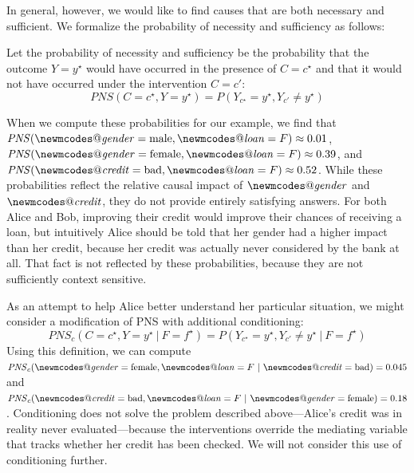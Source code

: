 \documentclass[anon,12pt]{clear2026} %
\makeatletter
\DeclareRobustCommand{\varname}[1]{\begingroup\newmcodes@\mathit{#1}\endgroup}
\newcommand{\pns}{\ensuremath{\mathit{PNS}}}
\makeatother
\begin{document}

In general, however, we would like to find causes that are both necessary and sufficient.
We formalize the probability of necessity and sufficiency as follows:

\begin{definition}
Let the probability of necessity and sufficiency be the probability that the outcome $Y=y^\star$ would have occurred in the presence of $C = c^\star$ and that it would not have occurred under the intervention $C=c'$:
\[\pns(C = c^{\star}, Y = y^\star) =  P\!(Y_{c^{\star}} = y^\star, Y_{c'} \neq y^\star )\]
\end{definition}

When we compute these probabilities for our example, we find that $\pns(\varname{gender}=\text{male}, \varname{loan}=F) \approx 0.01$, $\pns(\varname{gender}=\text{female}, \varname{loan}=F) \approx 0.39$, and $\pns(\varname{credit}=\text{bad}, \varname{loan}=F) \approx 0.52$.
While these probabilities reflect the relative causal impact of $\varname{gender}$ and $\varname{credit}$, they do not provide entirely satisfying answers.
For both Alice and Bob, improving their credit would improve their chances of receiving a loan, but intuitively Alice should be told that her gender had a higher impact than her credit, because her credit was actually never considered by the bank at all.
That fact is not reflected by these probabilities, because they are not sufficiently context sensitive.

As an attempt to help Alice better understand her particular situation, we might consider a modification of PNS with additional conditioning:
\[\pns_{c}(C = c^\star, Y = y^\star ~|~ F=f^\star) = P(Y_{c^\star} = y^\star, Y_{c'} \neq y^\star ~|~ F = f^\star)\]
Using this definition, we can compute $\pns_c(\varname{gender} = \text{female}, \varname{loan} = F ~|~ \varname{credit} = \text{bad}) = 0.045$ and $\pns_c(\varname{credit} = \text{bad}, \varname{loan} = F ~|~ \varname{gender} = \text{female}) = 0.18$.
Conditioning does not solve the problem described above---Alice's credit was in reality never evaluated---because the interventions override the mediating variable that tracks whether her credit has been checked.
We will not consider this use of conditioning further.
\end{document}
